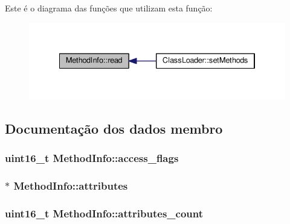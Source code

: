 Este é o diagrama das funções que utilizam esta função\+:
\nopagebreak
\begin{figure}[H]
\begin{center}
\leavevmode
\includegraphics[width=334pt]{struct_method_info_a96fbb8de441ef2af032c20d36d41eb7a_icgraph}
\end{center}
\end{figure}




\subsection{Documentação dos dados membro}
\subsubsection[{\texorpdfstring{access\+\_\+flags}{access_flags}}]{\setlength{\rightskip}{0pt plus 5cm}uint16\+\_\+t Method\+Info\+::access\+\_\+flags}\hypertarget{struct_method_info_ab24f22a8b4e3dcae351b0aa9dc6b7051}{}\label{struct_method_info_ab24f22a8b4e3dcae351b0aa9dc6b7051}
\subsubsection[{\texorpdfstring{attributes}{attributes}}]{$\ast$ Method\+Info\+::attributes}\hypertarget{struct_method_info_af480b7ee48a3812864ef16e3f0b44051}{}\label{struct_method_info_af480b7ee48a3812864ef16e3f0b44051}
\subsubsection[{\texorpdfstring{attributes\+\_\+count}{attributes_count}}]{\setlength{\rightskip}{0pt plus 5cm}uint16\+\_\+t Method\+Info\+::attributes\+\_\+count}\hypertarget{struct_method_info_ac7a3912757dd3af6ac55988fd42305f4}{}\label{struct_method_info_ac7a3912757dd3af6ac55988fd42305f4}
